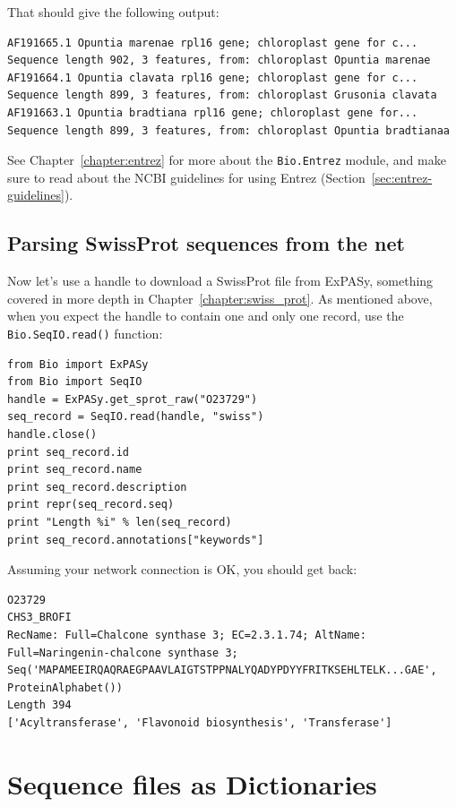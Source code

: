 \documentclass{report}
\begin{document}
\noindent That should give the following output:

\begin{verbatim}
AF191665.1 Opuntia marenae rpl16 gene; chloroplast gene for c...
Sequence length 902, 3 features, from: chloroplast Opuntia marenae
AF191664.1 Opuntia clavata rpl16 gene; chloroplast gene for c...
Sequence length 899, 3 features, from: chloroplast Grusonia clavata
AF191663.1 Opuntia bradtiana rpl16 gene; chloroplast gene for...
Sequence length 899, 3 features, from: chloroplast Opuntia bradtianaa
\end{verbatim}

See Chapter~\ref{chapter:entrez} for more about the \verb|Bio.Entrez| module, and make sure to read about the NCBI guidelines for using Entrez (Section~\ref{sec:entrez-guidelines}).

\subsection{Parsing SwissProt sequences from the net}
\label{sec:SeqIO_ExPASy_and_SwissProt}
Now let's use a handle to download a SwissProt file from ExPASy,
something covered in more depth in Chapter~\ref{chapter:swiss_prot}.
As mentioned above, when you expect the handle to contain one and only one record,
use the \verb|Bio.SeqIO.read()| function:

\begin{verbatim}
from Bio import ExPASy
from Bio import SeqIO
handle = ExPASy.get_sprot_raw("O23729")
seq_record = SeqIO.read(handle, "swiss")
handle.close()
print seq_record.id
print seq_record.name
print seq_record.description
print repr(seq_record.seq)
print "Length %i" % len(seq_record)
print seq_record.annotations["keywords"]
\end{verbatim}

\noindent Assuming your network connection is OK, you should get back:

\begin{verbatim}
O23729
CHS3_BROFI
RecName: Full=Chalcone synthase 3; EC=2.3.1.74; AltName: Full=Naringenin-chalcone synthase 3;
Seq('MAPAMEEIRQAQRAEGPAAVLAIGTSTPPNALYQADYPDYYFRITKSEHLTELK...GAE', ProteinAlphabet())
Length 394
['Acyltransferase', 'Flavonoid biosynthesis', 'Transferase']
\end{verbatim}

\section{Sequence files as Dictionaries}
\end{document}
